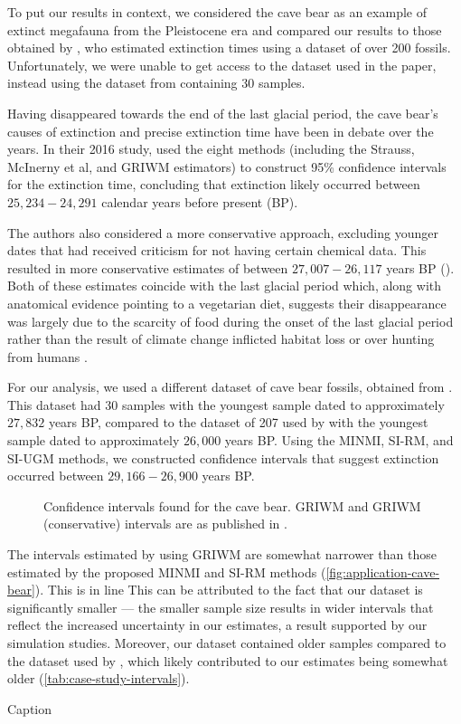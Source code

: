 To put our results in context, we considered the cave bear as an example of extinct megafauna from the Pleistocene era and compared our results to those obtained by \citet{Baca2016}, who estimated extinction times using a dataset of over 200 fossils. Unfortunately, we were unable to get access to the dataset used in the paper, instead using the dataset from \citet{Cooper2015} containing 30 samples.

Having disappeared towards the end of the last glacial period, the cave bear's causes of extinction and precise extinction time have been in debate over the years. In their 2016 study, \citet{Baca2016} used the eight methods (including the Strauss, McInerny et al, and GRIWM estimators) to construct 95\% confidence intervals for the extinction time, concluding that extinction likely occurred between $25,234 - 24,291$ calendar years before present (BP).

The authors also considered a more conservative approach, excluding younger dates that had received criticism for not having certain chemical data. This resulted in more conservative estimates of between $27,007 - 26,117$ years BP (\cite{Baca2016}). Both of these estimates coincide with the last glacial period which, along with anatomical evidence pointing to a vegetarian diet, suggests their disappearance was largely due to the scarcity of food during the onset of the last glacial period rather than the result of climate change inflicted habitat loss or over hunting from humans \cite{Pacher2009}.

For our analysis, we used a different dataset of cave bear fossils, obtained from \citet{Cooper2015}. This dataset had 30 samples with the youngest sample dated to approximately $27,832$ years BP, compared to the dataset of 207 used by \citet{Baca2016} with the youngest sample dated to approximately $26,000$ years BP. Using the MINMI, SI-RM, and SI-UGM methods, we constructed confidence intervals that suggest extinction occurred between $29,166 - 26,900$ years BP.
\begin{figure}[ht]
    \centering
    
    \caption{Confidence intervals found for the cave bear. GRIWM and GRIWM (conservative) intervals are as published in \citet{Baca2016}.}
    \label{fig:application-cave-bear}
\end{figure}

The intervals estimated by \citet{Baca2016} using GRIWM are somewhat narrower than those estimated by the proposed MINMI and SI-RM methods (\autoref{fig:application-cave-bear}). This is in line This can be attributed to the fact that our dataset is significantly smaller --- the smaller sample size results in wider intervals that reflect the increased uncertainty in our estimates, a result supported by our simulation studies. Moreover, our dataset contained older samples compared to the dataset used by \citet{Baca2016}, which likely contributed to our estimates being somewhat older (\autoref{tab:case-study-intervals}).
\begin{table}[ht]
    \centering
    \caption{Caption}
    
    \label{tab:case-study-intervals}
\end{table}
